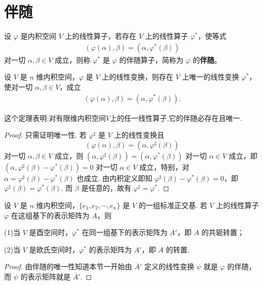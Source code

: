 \documentclass[../../main.tex]{subfiles}
\begin{document}
\section{伴随}

\begin{definition}[伴随]
设 $\varphi$ 是内积空间 $V$ 上的线性算子，若存在 $V$ 上的线性算子 $\varphi^*$，使等式
\begin{align*}
(\varphi(\alpha),\beta) = (\alpha,\varphi^*(\beta))
\end{align*}
对一切 $\alpha,\beta \in V$ 成立，则称 $\varphi^*$ 是 $\varphi$ 的伴随算子，简称为 $\varphi$ 的\textbf{伴随}。
\end{definition}

\begin{theorem}
设 $V$ 是 $n$ 维内积空间，$\varphi$ 是 $V$ 上的线性变换，则存在 $V$ 上唯一的线性变换 $\varphi^*$，使对一切 $\alpha,\beta \in V$，成立
\begin{align*}
(\varphi(\alpha),\beta) = (\alpha,\varphi^*(\beta)).
\end{align*}
\end{theorem}
\begin{note}
这个定理表明:对有限维内积空间$V$上的任一线性算子,它的伴随必存在且唯一.
\end{note}
\begin{proof}
只需证明唯一性. 若 $\varphi^{\sharp}$ 是 $V$ 上的线性变换且
\[
(\varphi(\alpha),\beta) = (\alpha,\varphi^{\sharp}(\beta))
\]
对一切 $\alpha,\beta \in V$ 成立，则 $(\alpha,\varphi^{\sharp}(\beta)) = (\alpha,\varphi^*(\beta))$ 对一切 $\alpha \in V$ 成立，即 $(\alpha,\varphi^{\sharp}(\beta) - \varphi^*(\beta)) = 0$ 对一切 $\alpha \in V$ 成立，特别，对 $\alpha = \varphi^{\sharp}(\beta) - \varphi^*(\beta)$ 也成立. 由内积定义即知 $\varphi^{\sharp}(\beta) - \varphi^*(\beta) = 0$，即 $\varphi^{\sharp}(\beta) = \varphi^*(\beta)$. 而 $\beta$ 是任意的，故有 $\varphi^{\sharp} = \varphi^*$.
\end{proof}

\begin{theorem}\label{theorem:伴随算子的矩阵}
设 $V$ 是 $n$ 维内积空间，$\{e_1,e_2,\cdots,e_n\}$ 是 $V$ 的一组标准正交基. 若 $V$ 上的线性算子 $\varphi$ 在这组基下的表示矩阵为 $A$，则

(1)当 $V$ 是酉空间时，$\varphi^*$ 在同一组基下的表示矩阵为 $\overline{A}'$，即 $A$ 的共轭转置；

(2)当 $V$ 是欧氏空间时，$\varphi^*$ 的表示矩阵为 $A'$，即 $A$ 的转置.
\end{theorem}
\begin{proof}
由伴随的唯一性知道本节一开始由 $\overline{A}'$ 定义的线性变换 $\psi$ 就是 $\varphi$ 的伴随，而 $\psi$ 的表示矩阵就是 $\overline{A}'$. 
\end{proof}
\end{document}
